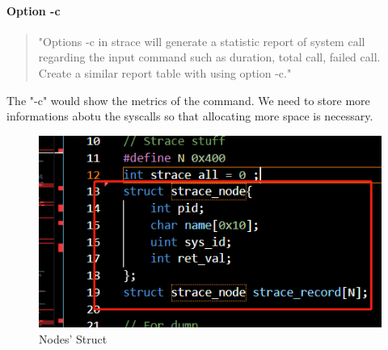 \documentclass[11pt,oneside,a4paper]{article}
\begin{document}
\paragraph*{Option -c}
\begin{quotation}
    "Options -c in strace will generate a statistic report of system call regarding the input command
    such as duration, total call, failed call. Create a similar report table with using option -c."
\end{quotation}

The "-c" would show the metrics of the command. We need to store more informations abotu 
the syscalls so that allocating more space is necessary. 

\begin{figure}[H]
    \includegraphics[width=4.75in]{1-28.png}
    \centering
    \caption{Nodes' Struct}
\end{figure}
\end{document}
